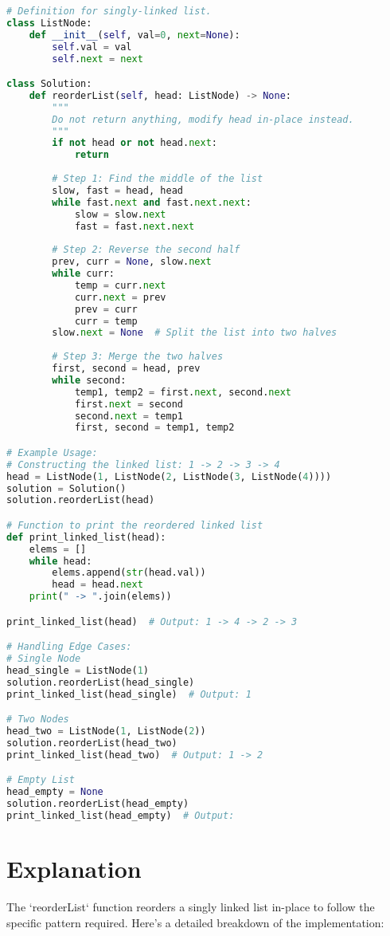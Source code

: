 \begin{fullwidth}
\begin{lstlisting}[language=Python]
# Definition for singly-linked list.
class ListNode:
    def __init__(self, val=0, next=None):
        self.val = val
        self.next = next

class Solution:
    def reorderList(self, head: ListNode) -> None:
        """
        Do not return anything, modify head in-place instead.
        """
        if not head or not head.next:
            return
        
        # Step 1: Find the middle of the list
        slow, fast = head, head
        while fast.next and fast.next.next:
            slow = slow.next
            fast = fast.next.next
        
        # Step 2: Reverse the second half
        prev, curr = None, slow.next
        while curr:
            temp = curr.next
            curr.next = prev
            prev = curr
            curr = temp
        slow.next = None  # Split the list into two halves
        
        # Step 3: Merge the two halves
        first, second = head, prev
        while second:
            temp1, temp2 = first.next, second.next
            first.next = second
            second.next = temp1
            first, second = temp1, temp2

# Example Usage:
# Constructing the linked list: 1 -> 2 -> 3 -> 4
head = ListNode(1, ListNode(2, ListNode(3, ListNode(4))))
solution = Solution()
solution.reorderList(head)

# Function to print the reordered linked list
def print_linked_list(head):
    elems = []
    while head:
        elems.append(str(head.val))
        head = head.next
    print(" -> ".join(elems))

print_linked_list(head)  # Output: 1 -> 4 -> 2 -> 3

# Handling Edge Cases:
# Single Node
head_single = ListNode(1)
solution.reorderList(head_single)
print_linked_list(head_single)  # Output: 1

# Two Nodes
head_two = ListNode(1, ListNode(2))
solution.reorderList(head_two)
print_linked_list(head_two)  # Output: 1 -> 2

# Empty List
head_empty = None
solution.reorderList(head_empty)
print_linked_list(head_empty)  # Output: 
\end{lstlisting}
\end{fullwidth}

\section*{Explanation}
The `reorderList` function reorders a singly linked list in-place to follow the specific pattern required. Here's a detailed breakdown of the implementation:

